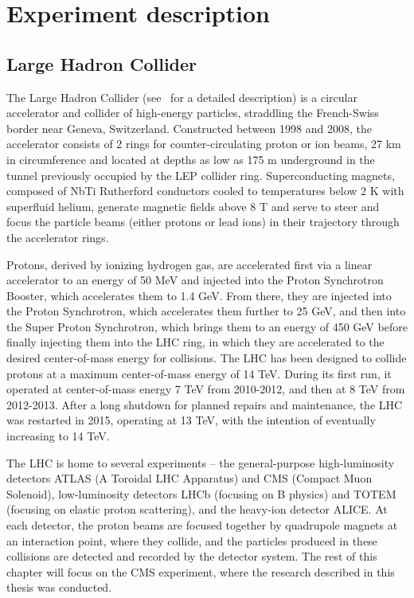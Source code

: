 \chapter{Experiment description\label{sec:experiment}}

\section{Large Hadron Collider\label{sec:lhc}}

The Large Hadron Collider (see~\cite{1748-0221-3-08-S08001} for a detailed description) is a circular accelerator and collider of high-energy particles, straddling the French-Swiss border near Geneva, Switzerland. Constructed between 1998 and 2008, the accelerator consists of 2 rings for counter-circulating proton or ion beams, 27 km in circumference and located at depths as low as 175 m underground in the tunnel previously occupied by the LEP collider ring. Superconducting magnets, composed of NbTi Rutherford conductors cooled to temperatures below 2 K with superfluid helium, generate magnetic fields above 8 T and serve to steer and focus the particle beams (either protons or lead ions) in their trajectory through the accelerator rings.

Protons, derived by ionizing hydrogen gas, are accelerated first via a linear accelerator to an energy of 50 MeV and injected into the Proton Synchrotron Booster, which accelerates them to 1.4 GeV. From there, they are injected into the Proton Synchrotron, which accelerates them further to 25 GeV, and then into the Super Proton Synchrotron, which brings them to an energy of 450 GeV before finally injecting them into the LHC ring, in which they are accelerated to the desired center-of-mass energy for collisions. The LHC has been designed to collide protons at a maximum center-of-mass energy of 14 TeV. During its first run, it operated at center-of-mass energy 7 TeV from 2010-2012, and then at 8 TeV from 2012-2013. After a long shutdown for planned repairs and maintenance, the LHC was restarted in 2015, operating at 13 TeV, with the intention of eventually increasing to 14 TeV.

The LHC is home to several experiments -- the general-purpose high-luminosity detectors ATLAS (A Toroidal LHC Apparatus) and CMS (Compact Muon Solenoid), low-luminosity detectors LHCb (focusing on B physics) and TOTEM (focusing on elastic proton scattering), and the heavy-ion detector ALICE. At each detector, the proton beams are focused together by quadrupole magnets at an interaction point, where they collide, and the particles produced in these collisions are detected and recorded by the detector system. The rest of this chapter will focus on the CMS experiment, where the research described in this thesis was conducted.

